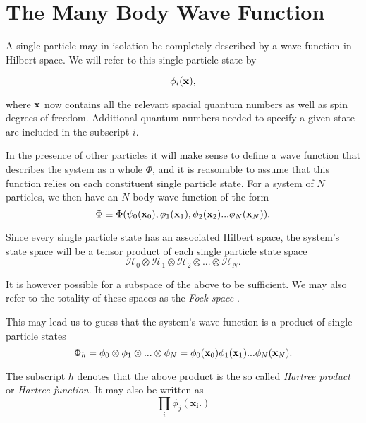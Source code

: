 
\section{The Many Body Wave Function}
A single particle may in isolation be completely described by a wave function in Hilbert space. We will refer to this single particle state by

$$ \phi_i(\bold{x}), $$

where $\bold{x}$ now contains all the relevant spacial quantum numbers as well as spin degrees of freedom. Additional quantum numbers needed to specify a given state are included in the subscript $i$.

In the presence of other particles it will make sense to define a wave
function that describes the system as a whole $\Phi$, and it is
reasonable to assume that this function relies on each constituent single particle
state. For a system of $N$ particles, we then have an $N$-body wave
function of the form
\begin{equation}
\Phi \equiv \Phi(\psi_0(\bold{x}_0), \phi_1(\bold{x}_1), \phi_2(\bold{x}_2) ... \phi_N(\bold{x}_N)). 
\label{eqn:tisldef}
\end{equation}

Since every single particle state has an associated Hilbert space, the system's state space will be a tensor product of each single particle state space
\begin{equation}
\mathcal{H}_0 \otimes \mathcal{H}_1 \otimes \mathcal{H}_2 \otimes ...  \otimes \mathcal{H}_N.
\label{eqn:systemspace}
\end{equation}

It is however possible for a subspace of the above to be sufficient. We may also refer to the totality of these spaces as the \emph{Fock space} \cite{ShavittBartlett2009}.

This may lead us to guess that the system's wave function is a product of single particle states
\begin{equation}
\Phi_h  = \phi_0 \otimes \phi_1 \otimes ...  \otimes \phi_N = \phi_0(\bold{x}_0) \phi_1(\bold{x}_1) ... \phi_N(\bold{x}_N).
\label{eqn:hartreeprod}
\end{equation}

The subscript $h$ denotes that the above product is the so called \emph{Hartree product} or \emph{Hartree function}. It may also be written as
\begin{equation}
\prod _{i} \phi _j(\mathbf{x_i}.)
\label{eqn:hartree3}
\end{equation}

